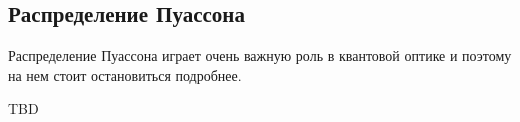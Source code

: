 \subsection{Распределение Пуассона}

Распределение Пуассона играет очень важную роль в квантовой оптике и
поэтому на нем стоит остановиться подробнее.

\begin{definition}
\end{definition}

TBD


